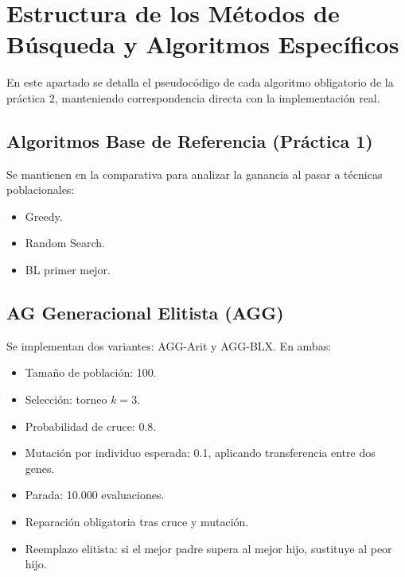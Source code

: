 \newpage
\section{Estructura de los Métodos de Búsqueda y Algoritmos Específicos}
\label{sec:algoritmos}

En este apartado se detalla el pseudocódigo de cada algoritmo obligatorio de la
práctica 2, manteniendo correspondencia directa con la implementación real.

\subsection{Algoritmos Base de Referencia (Práctica 1)}

Se mantienen en la comparativa para analizar la ganancia al pasar a técnicas
poblacionales:

\begin{itemize}[noitemsep]
    \item Greedy.
    \item Random Search.
    \item BL primer mejor.
\end{itemize}

\subsection{AG Generacional Elitista (AGG)}

Se implementan dos variantes: AGG-Arit y AGG-BLX. En ambas:

\begin{itemize}[noitemsep]
    \item Tamaño de población: 100.
    \item Selección: torneo $k=3$.
    \item Probabilidad de cruce: 0.8.
    \item Mutación por individuo esperada: 0.1, aplicando transferencia entre dos genes.
    \item Parada: 10.000 evaluaciones.
    \item Reparación obligatoria tras cruce y mutación.
    \item Reemplazo elitista: si el mejor padre supera al mejor hijo, sustituye al peor hijo.
\end{itemize}

